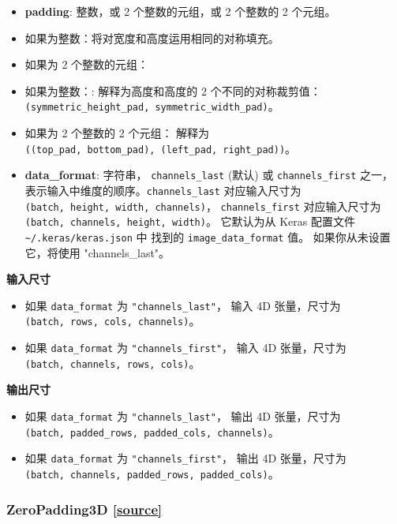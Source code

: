 \begin{itemize}
\tightlist
\item
  \textbf{padding}: 整数，或 2 个整数的元组，或 2 个整数的 2 个元组。
\item
  如果为整数：将对宽度和高度运用相同的对称填充。
\item
  如果为 2 个整数的元组：
\item
  如果为整数：: 解释为高度和高度的 2 个不同的对称裁剪值：
  \texttt{(symmetric\_height\_pad,\ symmetric\_width\_pad)}。
\item
  如果为 2 个整数的 2 个元组： 解释为
  \texttt{((top\_pad,\ bottom\_pad),\ (left\_pad,\ right\_pad))}。
\item
  \textbf{data\_format}: 字符串， \texttt{channels\_last} (默认) 或
  \texttt{channels\_first} 之一，
  表示输入中维度的顺序。\texttt{channels\_last} 对应输入尺寸为
  \texttt{(batch,\ height,\ width,\ channels)}，
  \texttt{channels\_first} 对应输入尺寸为
  \texttt{(batch,\ channels,\ height,\ width)}。 它默认为从 Keras
  配置文件 \texttt{\textasciitilde{}/.keras/keras.json} 中 找到的
  \texttt{image\_data\_format} 值。 如果你从未设置它，将使用
  "channels\_last"。
\end{itemize}

\textbf{输入尺寸}

\begin{itemize}
\tightlist
\item
  如果 \texttt{data\_format} 为 \texttt{"channels\_last"}， 输入 4D
  张量，尺寸为 \texttt{(batch,\ rows,\ cols,\ channels)}。
\item
  如果 \texttt{data\_format} 为 \texttt{"channels\_first"}， 输入 4D
  张量，尺寸为 \texttt{(batch,\ channels,\ rows,\ cols)}。
\end{itemize}

\textbf{输出尺寸}

\begin{itemize}
\tightlist
\item
  如果 \texttt{data\_format} 为 \texttt{"channels\_last"}， 输出 4D
  张量，尺寸为
  \texttt{(batch,\ padded\_rows,\ padded\_cols,\ channels)}。
\item
  如果 \texttt{data\_format} 为 \texttt{"channels\_first"}， 输出 4D
  张量，尺寸为
  \texttt{(batch,\ channels,\ padded\_rows,\ padded\_cols)}。
\end{itemize}




\subsubsection{ZeroPadding3D {\href{https://github.com/keras-team/keras/blob/master/keras/layers/convolutional.py\#L1844}{{[}source{]}}}}

